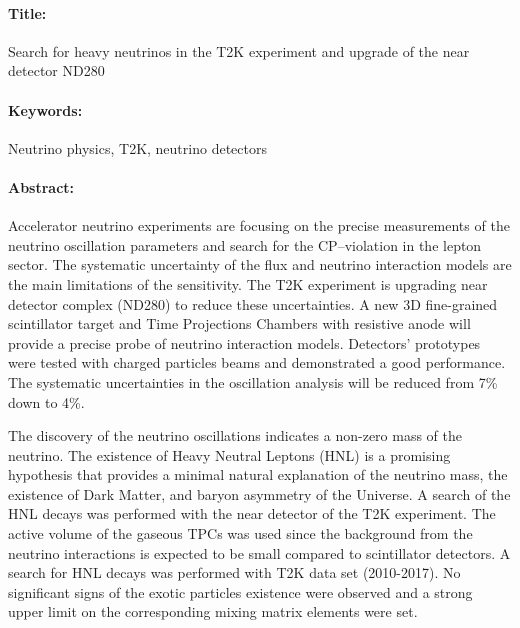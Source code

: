 \documentclass[../main.tex]{subfiles}
\begin{document}
\begin{mdframed}[linecolor=Prune,linewidth=1]
\vspace{-.25cm}
\paragraph*{Title:} Search for heavy neutrinos in the T2K experiment and upgrade of the near detector ND280

\begin{small}
\vspace{-.25cm}
\paragraph*{Keywords:} Neutrino physics, T2K, neutrino detectors

\vspace{-.5cm}
\begin{multicols}{2}
\paragraph*{Abstract:} Accelerator neutrino experiments are focusing on the precise measurements of the neutrino oscillation parameters and search for the CP--violation in the lepton sector. The systematic uncertainty of the flux and neutrino interaction models are the main limitations of the sensitivity. The T2K experiment is upgrading near detector complex (ND280) to reduce these uncertainties. A new 3D fine-grained scintillator target and Time Projections Chambers with resistive anode will provide a precise probe of neutrino interaction models. Detectors' prototypes were tested with charged particles beams and demonstrated a good performance. The systematic uncertainties in the oscillation analysis will be reduced from 7\% down to 4\%.

The discovery of the neutrino oscillations indicates a non-zero mass of the neutrino. The existence of Heavy Neutral Leptons (HNL) is a promising hypothesis that provides a minimal natural explanation of the neutrino mass, the existence of Dark Matter, and baryon asymmetry of the Universe. A search of the HNL decays was performed with the near detector of the T2K experiment. The active volume of the gaseous TPCs was used since the background from the neutrino interactions is expected to be small compared to scintillator detectors. A search for HNL decays was performed with T2K data set (2010-2017). No significant signs of the exotic particles existence were observed and a strong upper limit on the corresponding mixing matrix elements were set.
\end{multicols}
\end{small}
\end{mdframed}
\end{document}
